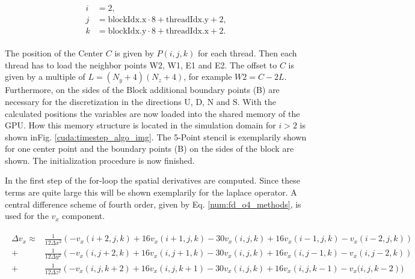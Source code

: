 \begin{align}
    \begin{split}
    i &= 2,\\
    j &= \text{blockIdx.x}\cdot 8 + \text{threadIdx.y} + 2,\\
    k &= \text{blockIdx.y}\cdot 8 + \text{threadIdx.x} + 2.
    \end{split}
\end{align}

The position of the Center $C$ is given by $P(i, j, k)$ for each thread.
Then each thread has to load the neighbor points W2, W1, E1 and E2.
The offset to $C$ is given by a multiple of ${L=(N_y+4)(N_z+4)}$, for example ${W2= C - 2L}$.
Furthermore, on the sides of the Block additional boundary points (B) are necessary for the discretization
in the directions U, D, N and S.
With the calculated positions the variables are now loaded into the shared memory of the GPU.
How this memory structure is located in the simulation domain  for $i>2$ is shown inFig. \ref{cuda:timestep_algo_img}.
The 5-Point stencil is exemplarily shown for one center point and the boundary points (B) on the sides of the block are shown.
The initialization procedure is now finished.

In the first step of the for-loop the spatial derivatives are computed.
Since these terms are quite large this will be shown exemplarily for the laplace operator.
A central difference scheme of fourth order, given by Eq. \ref{num:fd_o4_methods}, is used for the $v_x$ component.

\begin{align}
    \begin{split}
    \Delta v_x   \approx &  \frac{1}{12\Delta x^2} \left(-v_x(i+2, j, k) + 16v_x(i+1, j, k) - 30v_x(i, j, k) + 16v_x(i-1, j, k)-v_x(i-2, j, k)\right)\\
                              +&  \frac{1}{12\Delta y^2} \left(-v_x(i, j+2, k) + 16v_x(i, j+1, k) - 30v_x(i, j, k) + 16v_x(i, j-1, k)-v_x(i, j-2, k)\right)\\
                              +&  \frac{1}{12\Delta z^2} \left(-v_x(i, j, k+2) + 16v_x(i, j, k+1) - 30v_x(i, j, k) + 16v_x(i, j, k-1)-v_x(i, j, k-2\right))
    \end{split}
\end{align}

